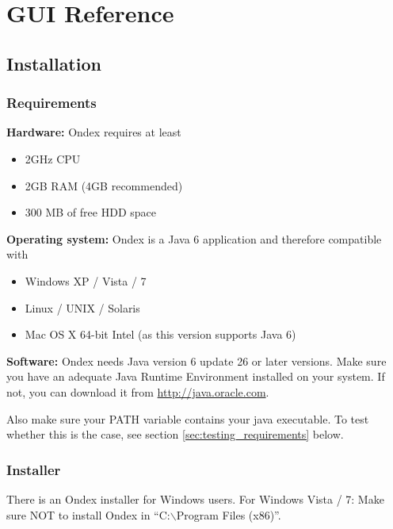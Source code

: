 \chapter{GUI Reference}
\label{cha:ref}



\section{Installation}
\label{sec:ref_install}

\subsection{Requirements}
\textbf{Hardware: }Ondex requires at least
\begin{itemize}
\item 2GHz CPU
\item 2GB RAM (4GB recommended)
\item 300 MB of free HDD space
\end{itemize}

\noindent\textbf{Operating system: }Ondex is a Java 6 application and therefore compatible with
\begin{itemize}
\item Windows XP / Vista / 7
\item Linux / UNIX / Solaris
\item Mac OS X 64-bit Intel (as this version supports Java 6)
\end{itemize}

\noindent\textbf{Software: }Ondex needs Java version 6 update 26 or later versions.
Make sure you have an adequate Java Runtime Environment installed on your system.
If not, you can download it from {\url{http://java.oracle.com}}.

Also make sure your PATH variable contains your java executable. 
To test whether this is the case, see section \ref{sec:testing_requirements} below.

\subsection{Installer}
There is an Ondex installer for Windows users. 
For Windows Vista / 7: Make sure NOT to install Ondex in ``C:$\backslash$Program Files (x86)''.


